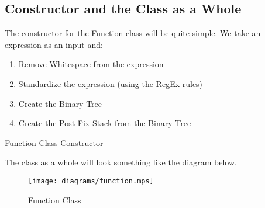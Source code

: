 \documentclass[../../../../../main.tex]{subfiles}
\begin{document}
\subsection{Constructor and the Class as a Whole}
The constructor for the Function class will be quite simple. We take an expression as an input and:
\begin{enumerate}
	\item Remove Whitespace from the expression
	\item Standardize the expression (using the RegEx rules)
	\item Create the Binary Tree
	\item Create the Post-Fix Stack from the Binary Tree
\end{enumerate}
\begin{algorithm}
\DontPrintSemicolon
\caption{Function Class Constructor}
\end{algorithm}
The class as a whole will look something like the diagram below.
\begin{figure}[H]
	\centering
	\texttt{[image: diagrams/function.mps]}
	\caption{Function Class}
\end{figure}
\newpage
\end{document}
